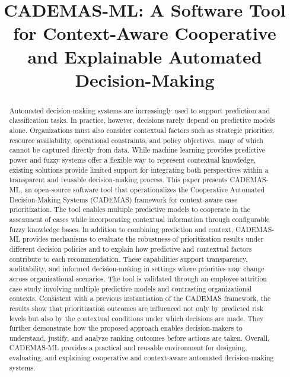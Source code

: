 \documentclass{interact}
\begin{document}
\title{CADEMAS-ML: A Software Tool for Context-Aware Cooperative and Explainable Automated Decision-Making}

\author{
}

\maketitle

\begin{abstract}
Automated decision-making systems are increasingly used to support prediction and classification tasks. In practice, however, decisions rarely depend on predictive models alone. Organizations must also consider contextual factors such as strategic priorities, resource availability, operational constraints, and policy objectives, many of which cannot be captured directly from data. While machine learning provides predictive power and fuzzy systems offer a flexible way to represent contextual knowledge, existing solutions provide limited support for integrating both perspectives within a transparent and reusable decision-making process.
This paper presents CADEMAS-ML, an open-source software tool that operationalizes the Cooperative Automated Decision-Making Systems (CADEMAS) framework for context-aware case prioritization. The tool enables multiple predictive models to cooperate in the assessment of cases while incorporating contextual information through configurable fuzzy knowledge bases. In addition to combining prediction and context, CADEMAS-ML provides mechanisms to evaluate the robustness of prioritization results under different decision policies and to explain how predictive and contextual factors contribute to each recommendation. These capabilities support transparency, auditability, and informed decision-making in settings where priorities may change across organizational scenarios.
The tool is validated through an employee attrition case study involving multiple predictive models and contrasting organizational contexts. Consistent with a previous instantiation of the CADEMAS framework, the results show that prioritization outcomes are influenced not only by predicted risk levels but also by the contextual conditions under which decisions are made. They further demonstrate how the proposed approach enables decision-makers to understand, justify, and analyze ranking outcomes before actions are taken. Overall, CADEMAS-ML provides a practical and reusable environment for designing, evaluating, and explaining cooperative and context-aware automated decision-making systems.
\end{abstract}
\end{document}
